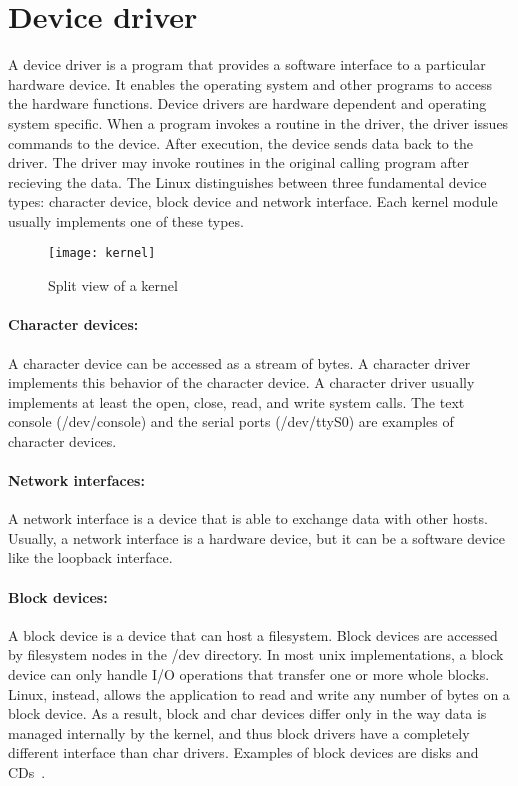 \section{Device driver}
\label{sec:device driver}
A device driver is a program that provides a software interface to a particular hardware device. It enables the operating system and other programs to access the hardware functions. Device drivers are hardware dependent and operating system specific. When a program invokes a routine in the driver, the driver issues commands to the device. After execution, the device sends data back to the driver. The driver may invoke routines in the original calling program after recieving the data. The Linux distinguishes between three fundamental device types: character device, block device and network interface. Each kernel module usually implements one of these types.
\begin{figure}[!ht]
\centering
\texttt{[image: kernel]}
\caption{Split view of a kernel}
\label{fig:kernel}
\end{figure}
\paragraph{Character devices:} A character device can be accessed as a stream of bytes. A character driver implements this behavior of the character device. A character driver usually implements at least the open, close, read, and write system calls. The text console (/dev/console) and the serial ports (/dev/ttyS0) are examples of character devices.

\paragraph{Network interfaces:} A network interface is a device that is able to exchange data with other hosts. Usually, a network interface is a hardware device, but it can be a software device like the loopback interface. 

\paragraph{Block devices:} A block device is a device that can host a filesystem. Block devices are accessed by filesystem nodes in the /dev directory. In most unix implementations, a block device can only handle I/O operations that transfer one or more whole blocks. Linux, instead, allows the application to read and write any number of bytes on a block device. As a result, block and char devices differ only in the way data is managed internally by the kernel, and thus block drivers have a completely different interface than char drivers. Examples of block devices are disks and CDs~\cite{Corbet:2005:LDD:1209083}.

